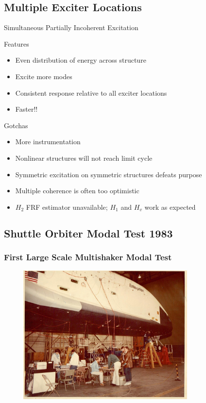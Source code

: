 \documentclass[aspectratio=169,10pt]{beamer} \mode<presentation>
\begin{document}
\subsection{Multiple Exciter Locations}
\begin{frame}[t]{Simultaneous Partially Incoherent Excitation}
  \begin{block}{Features}
    \begin{itemize}[<+->]
      \item Even distribution of energy across structure
      \item Excite more modes
      \item Consistent response relative to all exciter locations
      \item Faster!!
    \end{itemize}
  \end{block}
  \begin{block}{Gotchas}
    \begin{itemize}[<+->]
      \item More instrumentation
      \item Nonlinear structures will not reach limit cycle
      \item Symmetric excitation on symmetric structures defeats purpose
      \item Multiple coherence is often too optimistic
      \item $H_2$ FRF estimator unavailable; $H_1$ and $H_v$ work as expected
    \end{itemize}
  \end{block}
\end{frame}

\subsection{Shuttle Orbiter Modal Test 1983}

\begin{frame}
  \frametitle{First Large Scale Multishaker Modal Test}
  \begin{figure}
    \centering
    \includegraphics[width=0.65\linewidth,height=7cm]{SDRC-shuttle-1983}
  \end{figure}
\end{frame}
\end{document}
